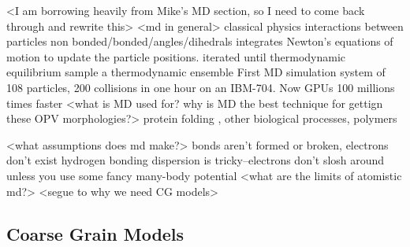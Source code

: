 <I am borrowing heavily from Mike's MD section, so I need to come back through and rewrite this>
<md in general>
classical physics
interactions between particles
non bonded/bonded/angles/dihedrals
integrates Newton's equations of motion to update the particle positions.
iterated until thermodynamic equilibrium
sample a thermodynamic ensemble
First MD simulation \cite{Alder1957} system of 108 particles, 200 collisions in one hour on an IBM-704.
Now GPUs 100 millions times faster
<what is MD used for? why is MD the best technique for gettign these OPV morphologies?>
protein folding \cite{levitt75}, other biological processes, polymers \cite{Gartner2019a}


<what assumptions does md make?>
bonds aren't formed or broken, electrons don't exist
hydrogen bonding
dispersion is tricky--electrons don't slosh around unless you use some fancy many-body potential
<what are the limits of atomistic md?>
<segue to why we need CG models>

\subsection*{Coarse Grain Models}

